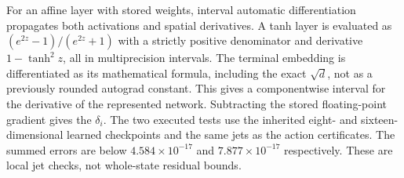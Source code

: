 For an affine layer with stored weights, interval automatic differentiation propagates both activations and spatial derivatives. A tanh layer is evaluated as $(e^{2z}-1)/(e^{2z}+1)$ with a strictly positive denominator and derivative $1-\tanh^2z$, all in multiprecision intervals. The terminal embedding is differentiated as its mathematical formula, including the exact $\sqrt d$, not as a previously rounded autograd constant. This gives a componentwise interval for the derivative of the represented network. Subtracting the stored floating-point gradient gives the $\delta_i$. The two executed tests use the inherited eight- and sixteen-dimensional learned checkpoints and the same jets as the action certificates. The summed errors are below $4.584\times10^{-17}$ and $7.877\times10^{-17}$ respectively. These are local jet checks, not whole-state residual bounds.

